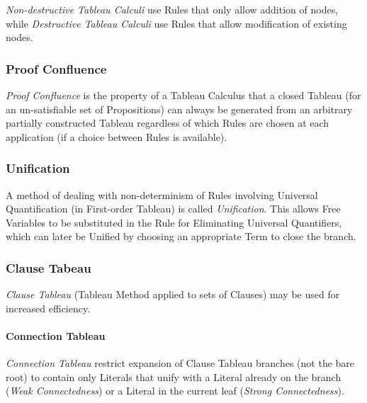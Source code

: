 \emph{Non-destructive Tableau Calculi} use Rules that only allow
addition of nodes, while \emph{Destructive Tableau Calculi} use Rules
that allow modification of existing nodes.



\subsubsection{Proof Confluence} \label{sec:proof_confluence}

\emph{Proof Confluence} is the property of a Tableau Calculus that a
closed Tableau (for an un-satisfiable set of Propositions) can always
be generated from an arbitrary partially constructed Tableau
regardless of which Rules are chosen at each application (if a choice
between Rules is available).



\subsubsection{Unification} \label{sec:tableau_unification}

A method of dealing with non-determinism of Rules involving Universal
Quantification (in First-order Tableau) is called \emph{Unification}.
This allows Free Variables to be substituted in the Rule for
Eliminating Universal Quantifiers, which can later be Unified by
choosing an appropriate Term to close the branch.



\subsubsection{Clause Tabeau} \label{sec:clause_tableau}

\emph{Clause Tableau} (Tableau Method applied to sets of Clauses) may
be used for increased efficiency.



\paragraph{Connection Tableau} \label{sec:connection_tableau}\hfill

\emph{Connection Tableau} restrict expansion of Clause Tableau
branches (not the bare root) to contain only Literals that unify with
a Literal already on the branch (\emph{Weak Connectedness}) or a
Literal in the current leaf (\emph{Strong Connectedness}).



